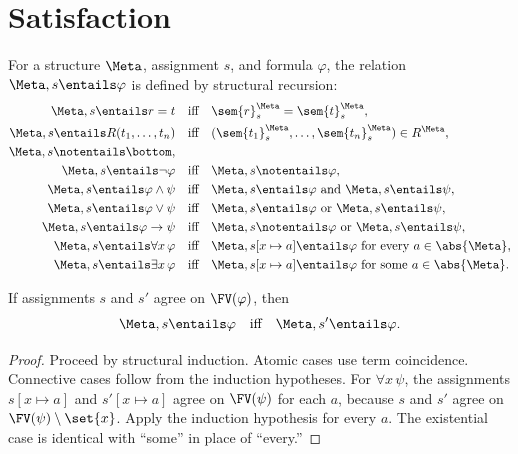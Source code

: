 \section{Satisfaction}
\label{sec:fol-semantics-02}

\begin{definition}[Satisfaction]
For a structure \(\Meta\), assignment \(s\), and formula \(\varphi\), the
relation \(\Meta,s\entails\varphi\) is defined by structural recursion:
\[
\begin{aligned}
 \Meta,s\entails r=t
 &\quad\text{iff}\quad
 \sem{r}^{\Meta}_s=\sem{t}^{\Meta}_s,\\
 \Meta,s\entails R(t_1,\ldots,t_n)
 &\quad\text{iff}\quad
 (\sem{t_1}^{\Meta}_s,\ldots,\sem{t_n}^{\Meta}_s)\in R^{\Meta},\\
 \Meta,s\notentails\bottom,
 &\\
 \Meta,s\entails\neg\varphi
 &\quad\text{iff}\quad\Meta,s\notentails\varphi,\\
 \Meta,s\entails\varphi\land\psi
 &\quad\text{iff}\quad
 \Meta,s\entails\varphi\text{ and }\Meta,s\entails\psi,\\
 \Meta,s\entails\varphi\lor\psi
 &\quad\text{iff}\quad
 \Meta,s\entails\varphi\text{ or }\Meta,s\entails\psi,\\
 \Meta,s\entails\varphi\to\psi
 &\quad\text{iff}\quad
 \Meta,s\notentails\varphi\text{ or }\Meta,s\entails\psi,\\
 \Meta,s\entails\forall x\,\varphi
 &\quad\text{iff}\quad
 \Meta,s[x\mapsto a]\entails\varphi
 \text{ for every }a\in\abs{\Meta},\\
 \Meta,s\entails\exists x\,\varphi
 &\quad\text{iff}\quad
 \Meta,s[x\mapsto a]\entails\varphi
 \text{ for some }a\in\abs{\Meta}.
\end{aligned}
\]
\end{definition}

\begin{lemma}
\label{lem:fol-coincidence}
If assignments \(s\) and \(s'\) agree on \(\FV(\varphi)\), then
\[
 \Meta,s\entails\varphi
 \quad\text{iff}\quad
 \Meta,s'\entails\varphi.
\]
\end{lemma}
\begin{proof}
Proceed by structural induction.  Atomic cases use term coincidence.
Connective cases follow from the induction hypotheses.  For
\(\forall x\,\psi\), the assignments
\(s[x\mapsto a]\) and \(s'[x\mapsto a]\) agree on \(\FV(\psi)\) for each
\(a\), because \(s\) and \(s'\) agree on
\(\FV(\psi)\setminus\set{x}\).  Apply the induction hypothesis for every
\(a\).  The existential case is identical with ``some'' in place of
``every.''
\end{proof}


